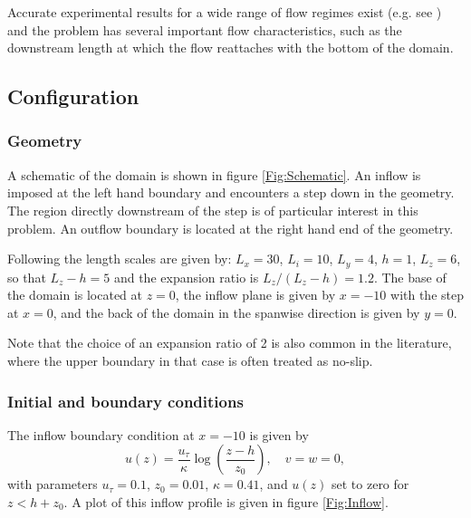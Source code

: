 Accurate experimental results for a wide range of flow regimes exist
(e.g. see \cite{armaly1983}) and the problem has several important flow
characteristics, such as the downstream length at which the flow reattaches
with the bottom of the domain.


\subsection{Configuration}
\subsubsection{Geometry}
A schematic of the domain is shown in figure \ref{Fig:Schematic}.
An inflow is imposed at the left hand boundary and encounters a step
down in the geometry. The region directly downstream of the step is
of particular interest in this problem. An outflow boundary is located at the
right hand end of the geometry.


Following \cite{le1997} the length scales are given by: $L_x=30$, $L_i=10$, $L_y=4$, $h=1$, $L_z=6$,
so that $L_z-h=5$ and the expansion ratio is $L_z/(L_z-h)=1.2$.
The base of the domain is located at $z=0$, the inflow plane is given by $x=-10$ with the step
at $x=0$, and the back of the domain in the spanwise direction is given by $y=0$.

Note that the choice of an expansion ratio
of 2 is also common in the literature, where the upper boundary in that case is often treated as no-slip.


\subsubsection{Initial and boundary conditions}
The inflow boundary condition at $x=-10$ is given by
\begin{equation}
u(z) = \frac{u_{\tau}}{\kappa} \log \left(\frac{z - h}{z_0}\right), \quad v = w = 0,
\end{equation}
with parameters $u_{\tau} = 0.1$, $z_0 = 0.01$, $\kappa = 0.41$, and $u(z)$ set to zero for
$z<h+z_0$.
A plot of this inflow profile is given in figure \ref{Fig:Inflow}.

